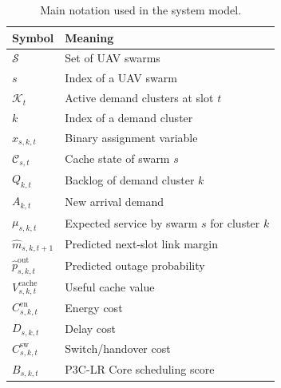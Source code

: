 \begin{table}[!t]
\centering
\caption{Main notation used in the system model.}
\label{tab:notation}
\scriptsize
\begin{tabular}{ll}
\toprule
Symbol & Meaning \\
\midrule
$\mathcal{S}$ & Set of UAV swarms \\
$s$ & Index of a UAV swarm \\
$\mathcal{K}_t$ & Active demand clusters at slot $t$ \\
$k$ & Index of a demand cluster \\
$x_{s,k,t}$ & Binary assignment variable \\
$\mathcal{C}_{s,t}$ & Cache state of swarm $s$ \\
$Q_{k,t}$ & Backlog of demand cluster $k$ \\
$A_{k,t}$ & New arrival demand \\
$\mu_{s,k,t}$ & Expected service by swarm $s$ for cluster $k$ \\
$\hat{m}_{s,k,t+1}$ & Predicted next-slot link margin \\
$\hat{p}^{\mathrm{out}}_{s,k,t}$ & Predicted outage probability \\
$V^{\mathrm{cache}}_{s,k,t}$ & Useful cache value \\
$C^{\mathrm{en}}_{s,k,t}$ & Energy cost \\
$D_{s,k,t}$ & Delay cost \\
$C^{\mathrm{sw}}_{s,k,t}$ & Switch/handover cost \\
$B_{s,k,t}$ & P3C-LR Core scheduling score \\
\bottomrule
\end{tabular}
\end{table}
